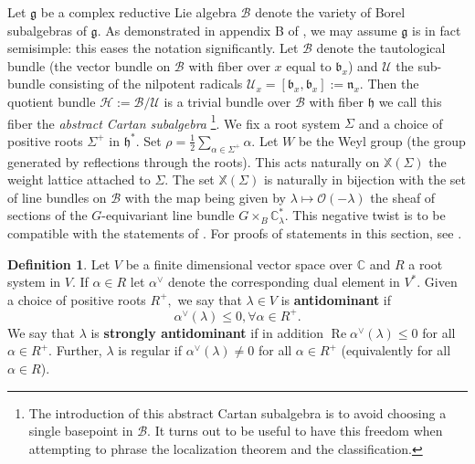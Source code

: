 \documentclass[letterpaper,twosided,11pt]{article}
\theoremstyle{plain}
\theoremstyle{definition}
\newtheorem{definition}{Definition}
\theoremstyle{remark}
\newcommand{\C}{\mathbb{C}}
\newcommand{\script}[1]{\mathscr{#1}}
\newcommand{\lie}[1]{\mathfrak{#1}}
\begin{document}
Let $ \lie{g} $ be
a complex reductive Lie algebra $ \mathcal{B} $ denote the variety of
Borel subalgebras of $ \lie{g}. $ As demonstrated in appendix B of
\cite{Hecht1987}, we may assume $ \lie{g} $ is in fact semisimple:  this
eases the notation significantly.  Let $ \script{B} $ denote the
tautological bundle (the vector bundle on $ \mathcal{B} $ with fiber
over $ x $ equal to $ \lie{b}_x $) and $ \script{U} $ the sub-bundle
consisting of the nilpotent radicals $ \script{U}_x=[\lie{b}_x,\lie{b}_x]:=\lie
{n}_x. $ Then the quotient bundle $ \script{H}:=\script{B}/\script{U} $
is a trivial bundle over $ \mathcal{B} $ with fiber $ \lie{h} $ we call
this fiber the \textit{abstract Cartan subalgebra}%
\footnote{The introduction of this abstract Cartan subalgebra is to
avoid choosing a single basepoint in $ \mathcal{B}. $ It turns out to be
useful to have this freedom when attempting to phrase the localization
theorem and the classification.}.  We fix a root system $ \Sigma $ and a
choice of positive roots $ \Sigma^+ $ in $ \lie{h}^*. $ Set $ \rho=\frac
{1}{2}\sum_{\alpha\in \Sigma^+} \alpha. $ Let $ W $ be the Weyl group (the
group generated by reflections through the roots).  This acts naturally
on $ \mathbb{X}(\Sigma) $ the weight lattice attached to $ \Sigma. $ The
set $ \mathbb{X}(\Sigma) $ is naturally in bijection with the set of
line bundles on $ \mathcal{B} $ with the map being given by $ \lambda\mapsto
\mathcal{O}(-\lambda) $ the sheaf of sections of the $ G $-equivariant
line bundle $ G\times_B \C^*_\lambda. $ This negative twist is to be
compatible with the statements of
\cite{Cook2025}.  For proofs of statements in this section, see
\cite{MilicicLocalization,Milicic1993}.

\begin{definition}
    \label{Definition_antidominant} Let $ V $ be a finite dimensional
    vector space over $ \C $ and $ R $ a root system in $ V $.  If $
    \alpha \in R $ let $ \alpha^\vee $ denote the corresponding dual
    element in $ V^*. $ Given a choice of positive roots $ R^+, $ we say
    that $ \lambda\in V $ is \textbf{antidominant} if
    \[
        \alpha^\vee(\lambda)\leq 0, \forall \alpha\in R^+.
    \]
    We say that $ \lambda $ is \textbf{strongly antidominant} if in
    addition $
    \operatorname{Re}
    \alpha^\vee(\lambda)\leq 0 $ for all $ \alpha\in R^+. $ Further, $
    \lambda $ is regular if $ \alpha^\vee(\lambda)\neq 0 $ for all $
    \alpha\in R^+ $ (equivalently for all $ \alpha\in R $).

\end{definition}
\end{document}

